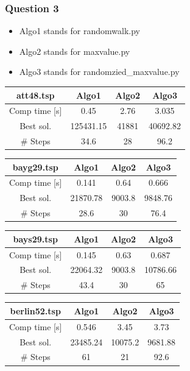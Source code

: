 \documentclass[a4paper,10pt]{article}
\begin{document}
\subsubsection{Question 3}
\begin{itemize}
\itemsep0em
\item Algo1 stands for randomwalk.py
\item Algo2 stands for maxvalue.py
\item Algo3 stands for randomzied\_maxvalue.py \\
\end{itemize}
\begin{center}
\begin{tabular}{|c|c|c|c|}
\hline 
att48.tsp & Algo1 & Algo2 & Algo3 \\ 
\hline 
Comp time [s] & 0.45 & 2.76 & 3.035 \\ 
\hline 
Best sol. & 125431.15 & 41881 & 40692.82 \\ 
\hline 
\# Steps & 34.6 & 28 & 96.2 \\ 
\hline 
\end{tabular} 
\end{center}
\begin{center}
\begin{tabular}{|c|c|c|c|}
\hline 
bayg29.tsp & Algo1 & Algo2 & Algo3 \\ 
\hline 
Comp time [s] & 0.141 & 0.64 & 0.666 \\ 
\hline 
Best sol. & 21870.78 & 9003.8 & 9848.76 \\ 
\hline 
\# Steps & 28.6 & 30 & 76.4 \\ 
\hline 
\end{tabular} 
\end{center}
\begin{center}
\begin{tabular}{|c|c|c|c|}
\hline 
bays29.tsp & Algo1 & Algo2 & Algo3 \\ 
\hline 
Comp time [s] & 0.145 & 0.63 & 0.687 \\ 
\hline 
Best sol. & 22064.32 & 9003.8 & 10786.66 \\ 
\hline 
\# Steps & 43.4 & 30 & 65 \\ 
\hline 
\end{tabular} 
\end{center}
\begin{center}
\begin{tabular}{|c|c|c|c|}
\hline 
berlin52.tsp & Algo1 & Algo2 & Algo3 \\ 
\hline 
Comp time [s] & 0.546 & 3.45 & 3.73 \\ 
\hline 
Best sol. & 23485.24 & 10075.2 & 9681.88 \\ 
\hline 
\# Steps & 61 & 21 & 92.6 \\ 
\hline 
\end{tabular} 
\end{center}
\end{document}
